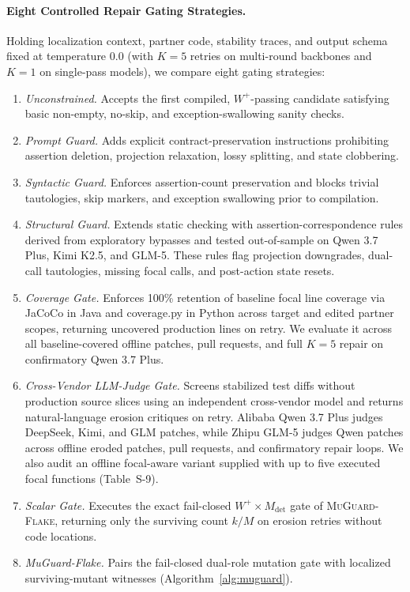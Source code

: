 \paragraph{Eight Controlled Repair Gating Strategies.}
Holding localization context, partner code, stability traces, and output schema fixed at temperature 0.0 (with $K = 5$ retries on multi-round backbones and $K = 1$ on single-pass models), we compare eight gating strategies:
\begin{enumerate}[nosep]
    \item \emph{Unconstrained.} Accepts the first compiled, $W^+$-passing candidate satisfying basic non-empty, no-skip, and exception-swallowing sanity checks.
    \item \emph{Prompt Guard.} Adds explicit contract-preservation instructions prohibiting assertion deletion, projection relaxation, lossy splitting, and state clobbering.
    \item \emph{Syntactic Guard.} Enforces assertion-count preservation and blocks trivial tautologies, skip markers, and exception swallowing prior to compilation.
    \item \emph{Structural Guard.} Extends static checking with assertion-correspondence rules derived from exploratory bypasses and tested out-of-sample on Qwen 3.7 Plus, Kimi K2.5, and GLM-5. These rules flag projection downgrades, dual-call tautologies, missing focal calls, and post-action state resets.
    \item \emph{Coverage Gate.} Enforces 100\% retention of baseline focal line coverage via JaCoCo in Java and coverage.py in Python across target and edited partner scopes, returning uncovered production lines on retry. We evaluate it across all baseline-covered offline patches, pull requests, and full $K=5$ repair on confirmatory Qwen 3.7 Plus.
    \item \emph{Cross-Vendor LLM-Judge Gate.} Screens stabilized test diffs without production source slices using an independent cross-vendor model and returns natural-language erosion critiques on retry. Alibaba Qwen 3.7 Plus judges DeepSeek, Kimi, and GLM patches, while Zhipu GLM-5 judges Qwen patches across offline eroded patches, pull requests, and confirmatory repair loops. We also audit an offline focal-aware variant supplied with up to five executed focal functions (Table~S-9).
    \item \emph{Scalar Gate.} Executes the exact fail-closed $W^+ \times M_{\text{det}}$ gate of \textsc{MuGuard-Flake}, returning only the surviving count $k/M$ on erosion retries without code locations.
    \item \emph{MuGuard-Flake.} Pairs the fail-closed dual-role mutation gate with localized surviving-mutant witnesses (Algorithm~\ref{alg:muguard}).
\end{enumerate}

